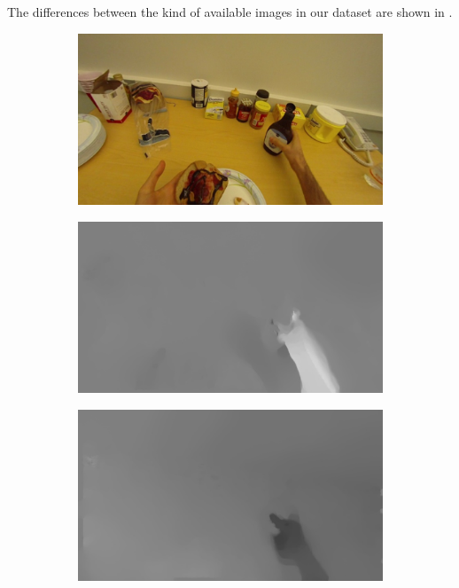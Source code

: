 \documentclass[10pt,twocolumn,hidelinks,letterpaper]{article}
\begin{document}
The differences between the kind of available images in our dataset are shown in .

\begin{figure}
  \centering
  \begin{subfigure}{.24\linewidth}
  	\includegraphics[width=\linewidth]{images/img_comp/rgb0001.png}
  \end{subfigure}
  \begin{subfigure}{.24\linewidth}
  	\includegraphics[width=\linewidth]{images/img_comp/flow_x_00002.png}
  \end{subfigure}
  \begin{subfigure}{.24\linewidth}
  	\includegraphics[width=\linewidth]{images/img_comp/flow_y_00001.png}

\end{subfigure}
\end{figure}
\end{document}
